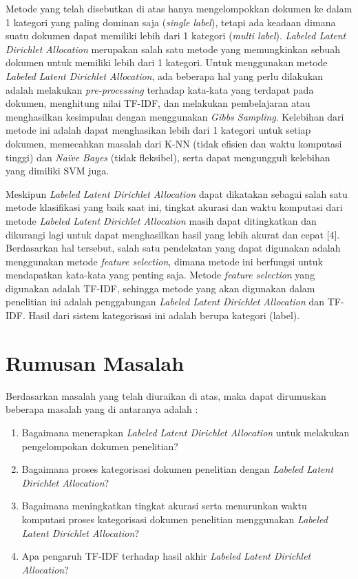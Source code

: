 \indent
Metode yang telah disebutkan di atas hanya mengelompokkan dokumen ke dalam 1 kategori yang paling dominan saja ({\itshape single label}), tetapi ada keadaan dimana suatu dokumen dapat memiliki lebih dari 1 kategori ({\itshape multi label}). {\itshape Labeled Latent Dirichlet Allocation} merupakan salah satu metode yang memungkinkan sebuah dokumen untuk memiliki lebih dari 1 kategori. Untuk menggunakan metode {\itshape Labeled Latent Dirichlet Allocation}, ada beberapa hal yang perlu dilakukan adalah melakukan {\itshape pre-processing} terhadap kata-kata yang terdapat pada dokumen, menghitung nilai TF-IDF, dan melakukan pembelajaran atau menghasilkan kesimpulan dengan menggunakan {\itshape Gibbs Sampling}. Kelebihan dari metode ini adalah dapat menghasikan lebih dari 1 kategori untuk setiap dokumen, memecahkan masalah dari K-NN (tidak efisien dan waktu komputasi tinggi) dan {\itshape Naïve Bayes} (tidak fleksibel), serta dapat mengungguli kelebihan yang dimiliki SVM juga. 

\indent
Meskipun {\itshape Labeled Latent Dirichlet Allocation} dapat dikatakan sebagai salah satu metode klasifikasi yang baik saat ini, tingkat akurasi dan waktu komputasi dari metode {\itshape Labeled Latent Dirichlet Allocation} masih dapat ditingkatkan dan dikurangi lagi untuk dapat menghasilkan hasil yang lebih akurat dan cepat [4]. Berdasarkan hal tersebut, salah satu pendekatan yang dapat digunakan adalah menggunakan metode {\itshape feature selection}, dimana metode ini berfungsi untuk mendapatkan kata-kata yang penting saja. Metode {\itshape feature selection} yang digunakan adalah TF-IDF, sehingga metode yang akan digunakan dalam penelitian ini adalah penggabungan {\itshape Labeled Latent Dirichlet Allocation} dan TF-IDF. Hasil dari sistem kategorisasi ini adalah berupa kategori (label).

\section{Rumusan Masalah}
\indent
Berdasarkan masalah yang telah diuraikan di atas, maka dapat dirumuskan beberapa masalah yang di antaranya adalah :

\begin{enumerate}[nolistsep,leftmargin=0.5cm]
\item 
Bagaimana menerapkan {\itshape Labeled Latent Dirichlet Allocation} untuk melakukan pengelompokan dokumen penelitian?
\item
Bagaimana proses kategorisasi dokumen penelitian dengan {\itshape  Labeled Latent Dirichlet Allocation}?
\item 
Bagaimana meningkatkan tingkat akurasi serta menurunkan waktu komputasi proses kategorisasi dokumen penelitian menggunakan {\itshape Labeled Latent Dirichlet Allocation}?
\item 
Apa pengaruh TF-IDF terhadap hasil akhir {\itshape Labeled Latent Dirichlet Allocation}?
\end{enumerate}

